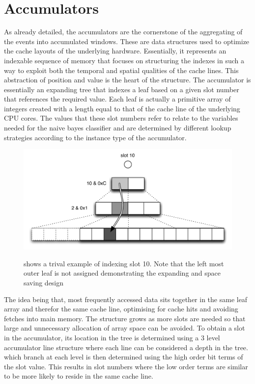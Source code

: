 \documentclass[a4paper,11pt]{scrreprt}
\begin{document}
\section{Accumulators}
As already detailed, the accumulators are the cornerstone of the aggregating of the events into accumulated windows. These are data structures used to optimize the cache layouts of the underlying hardware. Essentially,  it represents an indexable sequence of memory that focuses on structuring the indexes in such a way to exploit both the temporal and spatial qualities of the cache lines. This abstraction of position and value is the heart of the structure. The accumulator is essentially an expanding tree that indexes a leaf based on a given slot number that references the required value. Each leaf is actually a primitive array of integers created with a length equal to that of the cache line of the underlying CPU cores. The values that these slot numbers refer to relate to the variables needed for the naive bayes classifier and are determined by different lookup strategies according to the instance type of the accumulator. \\
\begin{figure}[h!]
\centering
\caption{shows a trival example of indexing slot 10. Note that the left most outer leaf is not assigned demonstrating the expanding and space saving design}
\includegraphics[scale=0.72, trim=0 0 0 12, clip=true] {accumulator-lookup.pdf}
\label{fig:accumulator-lookup}
\end{figure}

The idea being that, most frequently accessed data sits together in the same leaf array and therefor the same cache line, optimising for cache hits and avoiding fetches into main memory. The structure grows as more slots are needed so that large and unnecessary allocation of array space can be avoided. To obtain a slot in the accumulator, its location in the tree is determined using a 3 level accumulator line structure where each line can be considered a depth in the tree. which branch at each level is then determined using the high order bit terms of the slot value. This results in slot numbers where the low order terms are similar to be more likely to reside in the same cache line.
\end{document}
